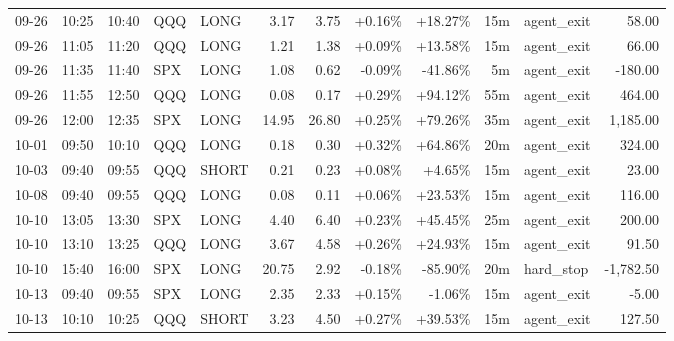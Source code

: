 \documentclass[11pt,a4paper]{article}
\begin{document}
\begin{center}
\begin{longtable}{>{\color{txtmain}}l l l l l r r r r r >{\color{txtmain}}l r}
09-26 & 10:25 & 10:40 & QQQ & LONG & 3.17 & 3.75 & \textcolor{wingreen}{+0.16\%} & \textcolor{wingreen}{+18.27\%} & 15m & agent\_exit & \textcolor{wingreen}{58.00} \\
09-26 & 11:05 & 11:20 & QQQ & LONG & 1.21 & 1.38 & \textcolor{wingreen}{+0.09\%} & \textcolor{wingreen}{+13.58\%} & 15m & agent\_exit & \textcolor{wingreen}{66.00} \\
09-26 & 11:35 & 11:40 & SPX & LONG & 1.08 & 0.62 & \textcolor{lossred}{-0.09\%} & \textcolor{lossred}{-41.86\%} & 5m & agent\_exit & \textcolor{lossred}{-180.00} \\
09-26 & 11:55 & 12:50 & QQQ & LONG & 0.08 & 0.17 & \textcolor{wingreen}{+0.29\%} & \textcolor{wingreen}{+94.12\%} & 55m & agent\_exit & \textcolor{wingreen}{464.00} \\
09-26 & 12:00 & 12:35 & SPX & LONG & 14.95 & 26.80 & \textcolor{wingreen}{+0.25\%} & \textcolor{wingreen}{+79.26\%} & 35m & agent\_exit & \textcolor{wingreen}{1,185.00} \\
10-01 & 09:50 & 10:10 & QQQ & LONG & 0.18 & 0.30 & \textcolor{wingreen}{+0.32\%} & \textcolor{wingreen}{+64.86\%} & 20m & agent\_exit & \textcolor{wingreen}{324.00} \\
10-03 & 09:40 & 09:55 & QQQ & SHORT & 0.21 & 0.23 & \textcolor{wingreen}{+0.08\%} & \textcolor{wingreen}{+4.65\%} & 15m & agent\_exit & \textcolor{wingreen}{23.00} \\
10-08 & 09:40 & 09:55 & QQQ & LONG & 0.08 & 0.11 & \textcolor{wingreen}{+0.06\%} & \textcolor{wingreen}{+23.53\%} & 15m & agent\_exit & \textcolor{wingreen}{116.00} \\
10-10 & 13:05 & 13:30 & SPX & LONG & 4.40 & 6.40 & \textcolor{wingreen}{+0.23\%} & \textcolor{wingreen}{+45.45\%} & 25m & agent\_exit & \textcolor{wingreen}{200.00} \\
10-10 & 13:10 & 13:25 & QQQ & LONG & 3.67 & 4.58 & \textcolor{wingreen}{+0.26\%} & \textcolor{wingreen}{+24.93\%} & 15m & agent\_exit & \textcolor{wingreen}{91.50} \\
10-10 & 15:40 & 16:00 & SPX & LONG & 20.75 & 2.92 & \textcolor{lossred}{-0.18\%} & \textcolor{lossred}{-85.90\%} & 20m & hard\_stop & \textcolor{lossred}{-1,782.50} \\
10-13 & 09:40 & 09:55 & SPX & LONG & 2.35 & 2.33 & \textcolor{wingreen}{+0.15\%} & \textcolor{lossred}{-1.06\%} & 15m & agent\_exit & \textcolor{lossred}{-5.00} \\
10-13 & 10:10 & 10:25 & QQQ & SHORT & 3.23 & 4.50 & \textcolor{wingreen}{+0.27\%} & \textcolor{wingreen}{+39.53\%} & 15m & agent\_exit & \textcolor{wingreen}{127.50} \\

\end{longtable}
\end{center}
\end{document}
